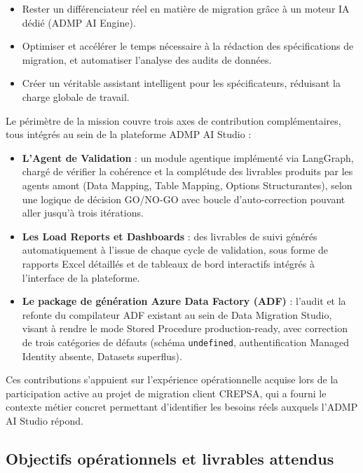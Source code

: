 \begin{itemize}
    \item Rester un différenciateur réel en matière de migration grâce à un moteur IA dédié (ADMP AI Engine).
    \item Optimiser et accélérer le temps nécessaire à la rédaction des spécifications de migration, et automatiser l'analyse des audits de données.
    \item Créer un véritable assistant intelligent pour les spécificateurs, réduisant la charge globale de travail.
\end{itemize}

Le périmètre de la mission couvre trois axes de contribution complémentaires, tous intégrés au sein de la plateforme ADMP AI Studio :

\begin{itemize}
    \item \textbf{L'Agent de Validation} : un module agentique implémenté via LangGraph, chargé de vérifier la cohérence et la complétude des livrables produits par les agents amont (Data Mapping, Table Mapping, Options Structurantes), selon une logique de décision GO/NO-GO avec boucle d'auto-correction pouvant aller jusqu'à trois itérations.
    \item \textbf{Les Load Reports et Dashboards} : des livrables de suivi générés automatiquement à l'issue de chaque cycle de validation, sous forme de rapports Excel détaillés et de tableaux de bord interactifs intégrés à l'interface de la plateforme.
    \item \textbf{Le package de génération Azure Data Factory (ADF)} : l'audit et la refonte du compilateur ADF existant au sein de Data Migration Studio, visant à rendre le mode Stored Procedure production-ready, avec correction de trois catégories de défauts (schéma \texttt{undefined}, authentification Managed Identity absente, Datasets superflus).
\end{itemize}

Ces contributions s'appuient sur l'expérience opérationnelle acquise lors de la participation active au projet de migration client CREPSA, qui a fourni le contexte métier concret permettant d'identifier les besoins réels auxquels l'ADMP AI Studio répond.

\subsection{Objectifs opérationnels et livrables attendus}

